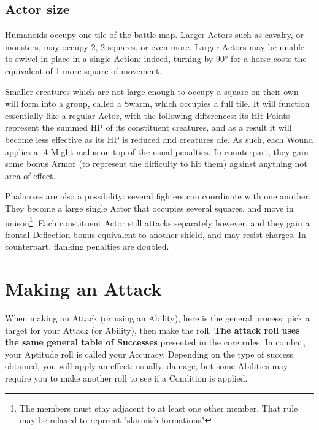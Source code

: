 \subsection{Actor size}

\label{actor_size}

Humanoids occupy one tile of the battle map. Larger Actors such as cavalry, or monsters, may occupy 2, 2 squares, or even more. Larger Actors may be unable to swivel in place in a single Action: indeed, turning by 90° for a horse costs the equivalent of 1 more square of movement.

Smaller creatures which are not large enough to occupy a square on their own will form into a group, called a Swarm, which occupies a full tile. It will function essentially like a regular Actor, with the following differences: its Hit Points represent the summed HP of its constituent creatures, and as a result it will become less effective as its HP is reduced and creatures die. As such, each Wound applies a -4 Might malus on top of the usual penalties. In counterpart, they gain some bonus Armor (to represent the difficulty to hit them) against anything not area-of-effect.

Phalanxes are also a possibility: several fighters can coordinate with one another. They become a large single Actor that occupies several squares, and move in unison\footnote{The members must stay adjacent to at least one other member. That rule may be relaxed to repreent "skirmish formations"}. Each constituent Actor still attacks separately however, and they gain a frontal Deflection bonus equivalent to another shield, and may resist charges. In counterpart, flanking penalties are doubled. 


\section{Making an Attack}


When making an Attack (or using an Ability), here is the general process: pick a target for your Attack (or Ability), then make the roll. \textbf{The attack roll uses the same general table of Successes} presented in the core rules. In combat, your Aptitude roll is called your Accuracy. Depending on the type of success obtained, you will apply an effect: usually, damage, but some Abilities may require you to make another roll to see if a Condition is applied.



